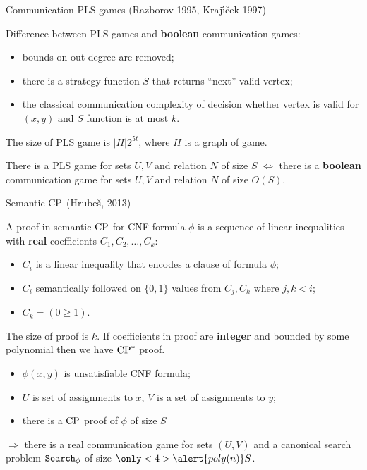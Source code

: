 \begin{frame}{Communication PLS games (Razborov 1995, Kraj{\'{\i}}{\v{c}}ek 1997)}

    Difference between PLS games and \textbf{boolean} communication games:
    \begin{itemize}
        \item bounds on out-degree are removed;
        \item there is a strategy function $S$ that returns ``next'' valid vertex;
        \item the classical communication complexity of decision whether vertex is valid for $(x, y)$ and $S$ function is at
            most $k$.
    \end{itemize}

    The size of PLS game is $|H| 2^{5 t}$, where $H$ is a graph of game.

    \pause

    \begin{theorem}[S 2016, unp.]
        There is a PLS game for sets $U, V$ and relation $N$ of size $S$ $\Leftrightarrow$ there is a \textbf{boolean}
        communication game for sets $U, V$ and relation $N$ of size $O(S)$.
    \end{theorem}

\end{frame}


\begin{frame}{Semantic $\mathrm{CP}$ (Hrube{\v{s}}, 2013)}

    A proof in semantic $\mathrm{CP}$ for CNF formula $\phi$ is a sequence of linear inequalities with \textbf{real} coefficients
    $C_1, C_2, \dots, C_k$:
    \begin{itemize}
        \item $C_i$ is a linear inequality that encodes a clause of formula $\phi$;
        \item $C_i$ semantically followed on $\{0, 1\}$ values from $C_j, C_k$ where $j, k < i$;
        \item $C_k = (0 \ge 1)$.
    \end{itemize}

    \pause
    The size of proof is $k$. If coefficients in proof are \textbf{integer} and bounded by some polynomial then we have
    $\mathrm{CP}^*$ proof.

    \pause

    \begin{lemma}[S 2016, unp.]
        \begin{itemize}
            \item $\phi(x, y)$ is unsatisfiable CNF formula;
            \item $U$ is set of assignments to $x$, $V$ is a set of assignments to $y$;
            \item there is a $\mathrm{CP}$  proof of $\phi$ of size $S$
        \end{itemize}
        $\Rightarrow$ there is a real  communication game for sets $(U, V)$ and a canonical search
        problem $\mathtt{Search}_{\phi}$ of size $\only<4>{\alert{poly(n)}} S$.
    \end{lemma}

\end{frame}

